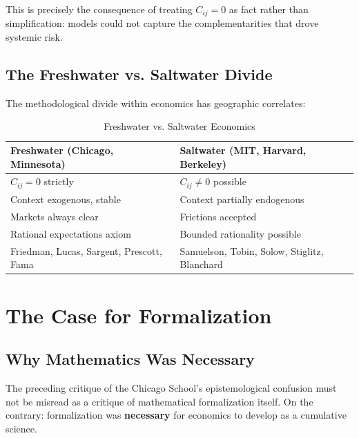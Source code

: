 \documentclass[12pt,a4paper]{article}
\begin{document}
This is precisely the consequence of treating $C_{ij} = 0$ as fact rather than simplification: models could not capture the complementarities that drove systemic risk.

\subsection{The Freshwater vs. Saltwater Divide}

The methodological divide within economics has geographic correlates:

\begin{table}[H]
\centering
\caption{Freshwater vs. Saltwater Economics}
\label{tab:freshwater-saltwater}
\renewcommand{\arraystretch}{1.3}
\small
\begin{tabular}{@{}p{5.5cm}p{5.5cm}@{}}
\toprule
\textbf{Freshwater (Chicago, Minnesota)} & \textbf{Saltwater (MIT, Harvard, Berkeley)} \\
\midrule
$C_{ij} = 0$ strictly & $C_{ij} \neq 0$ possible \\
Context exogenous, stable & Context partially endogenous \\
Markets always clear & Frictions accepted \\
Rational expectations axiom & Bounded rationality possible \\
\midrule
Friedman, Lucas, Sargent, Prescott, Fama & Samuelson, Tobin, Solow, Stiglitz, Blanchard \\
\bottomrule
\end{tabular}
\end{table}

\section{The Case for Formalization}
\label{sec:formalization}

\subsection{Why Mathematics Was Necessary}

The preceding critique of the Chicago School's epistemological confusion must not be misread as a critique of mathematical formalization itself. On the contrary: formalization was \textbf{necessary} for economics to develop as a cumulative science.
\end{document}
